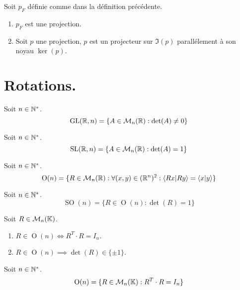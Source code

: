 \begin{proposition}
    Soit $p_F$ définie comme dans la définition précédente.
    \begin{enumerate}
        \item $p_F$ est une projection.
        \item Soit $p$ une projection, $p$ est un projecteur sur $\Im(p)$ parallélement à son noyau $\ker(p)$.
    \end{enumerate}
\end{proposition}

\section{Rotations.}
\begin{definition}
	Soit $n \in \mathbb{N}^*$.
    \[ \operatorname{GL}(\mathbb{R}, n) = \{ A \in \mathcal{M}_n(\mathbb{R}) : \det(A) \neq 0 \} \]
\end{definition}

\begin{definition}
	Soit $n \in \mathbb{N}^*$.
    \[ \operatorname{SL}(\mathbb{R}, n) = \{ A \in \mathcal{M}_n(\mathbb{R}) : \det(A) = 1 \} \]
\end{definition}

\begin{definition}
	Soit $n \in \mathbb{N}^*$.
    \[ \operatorname{O}(n) = \{ R \in \mathcal{M}_n(\mathbb{R}) : \forall (x, y) \in (\mathbb{R}^n)^2 : \langle Rx|Ry \rangle = \langle x|y \rangle \} \]
\end{definition}

\begin{definition}
    Soit $n \in \mathbb{N}^*$.
    \[ \operatorname{SO}(n) = \{ R \in \operatorname{O}(n) : \det(R) = 1 \} \]
\end{definition}

\begin{proposition}
	Soit $R \in \mathcal{M}_n(\mathbb{K})$.
    \begin{enumerate}
        \item $R \in \operatorname{O}(n) \iff R^T \cdot R = I_n$.
        \item $R \in \operatorname{O}(n) \implies \det(R) \in \{ \pm 1 \}$.
    \end{enumerate}
\end{proposition}

\begin{corollary}
	Soit $n \in \mathbb{N}^*$.
    \[ \operatorname{O}(n) = \{ R \in \mathcal{M}_n(\mathbb{K}) : R^T \cdot R = I_n \} \]
\end{corollary}

